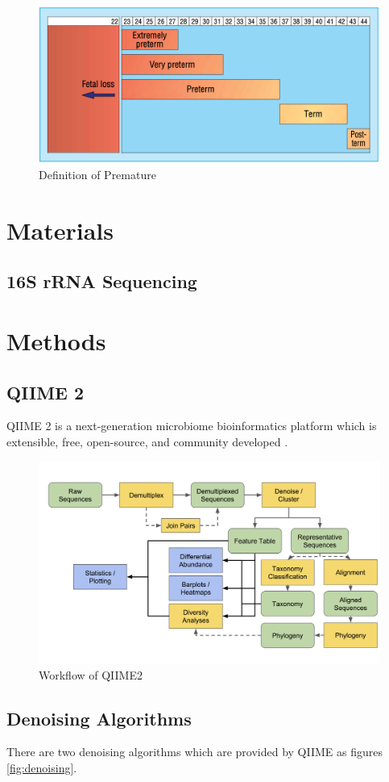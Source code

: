 \documentclass[a4paper]{article}
\begin{document}
            \begin{figure}[p]
                \centering
                \includegraphics[width=0.4 \linewidth]{figures/premature.png}
                \caption{Definition of Premature \protect \cite{premature1}}
                \label{fig:ptb}
            \end{figure}

    \section{Materials}
        \subsection{16S rRNA Sequencing}

    \section{Methods}
        \subsection{QIIME 2}
            QIIME 2 is a next-generation microbiome bioinformatics platform which is extensible, free, open-source, and community developed \cite{qiime1, qiime2, qiime3}.

            \begin{figure}[p]
                \centering
                \includegraphics[width=0.6 \linewidth]{figures/qiime.png}
                \caption{Workflow of QIIME2}
                \label{fig:qiime2}
            \end{figure}

        \subsection{Denoising Algorithms}
            There are two denoising algorithms which are provided by QIIME as figures \ref{fig:denoising}.
\end{document}
